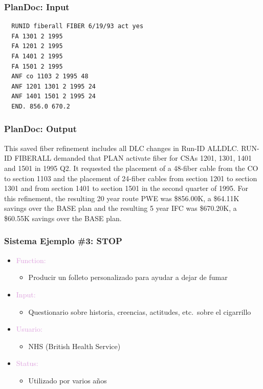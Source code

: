 \documentclass[compress,color=usenames]{beamer}
\newcommand{\mH}[1]{\textcolor{Plum}{#1}}
\begin{document}
\begin{frame}[fragile]
\frametitle{PlanDoc: Input}

\begin{verbatim}
  RUNID fiberall FIBER 6/19/93 act yes
  FA 1301 2 1995
  FA 1201 2 1995
  FA 1401 2 1995
  FA 1501 2 1995
  ANF co 1103 2 1995 48
  ANF 1201 1301 2 1995 24
  ANF 1401 1501 2 1995 24
  END. 856.0 670.2
\end{verbatim}

\end{frame}

\begin{frame}
\frametitle{PlanDoc: Output}

This saved fiber refinement includes all DLC changes in Run-ID ALLDLC. RUN-ID FIBERALL demanded that PLAN activate fiber for CSAs 1201, 1301, 1401 and 1501 in 1995 Q2. It requested the placement of a 48-fiber cable from the CO to section 1103 and the placement of 24-fiber cables from section 1201 to section 1301 and from section 1401 to section 1501 in the second quarter of 1995. For this refinement, the resulting 20 year route PWE was \$856.00K, a \$64.11K savings over the BASE plan and the resulting 5 year IFC was \$670.20K, a \$60.55K savings over the BASE plan.
\end{frame}

\begin{frame}
\frametitle{Sistema Ejemplo \#3: STOP}

\begin{itemize}
\item \mH{Function: }
\begin{itemize}
\item Producir un folleto personalizado para ayudar a dejar de fumar 
\end{itemize}
\item \mH{Input: }
\begin{itemize}
\item Questionario sobre historia, creencias, actitudes, etc.\ sobre el cigarrillo
\end{itemize}
\item \mH{Usuario: }
\begin{itemize}
\item NHS (British Health Service)
\end{itemize}
\item \mH{Status: }
\begin{itemize}
\item Utilizado por varios a\~nos
\end{itemize}
\end{itemize}

\end{frame}
\end{document}
